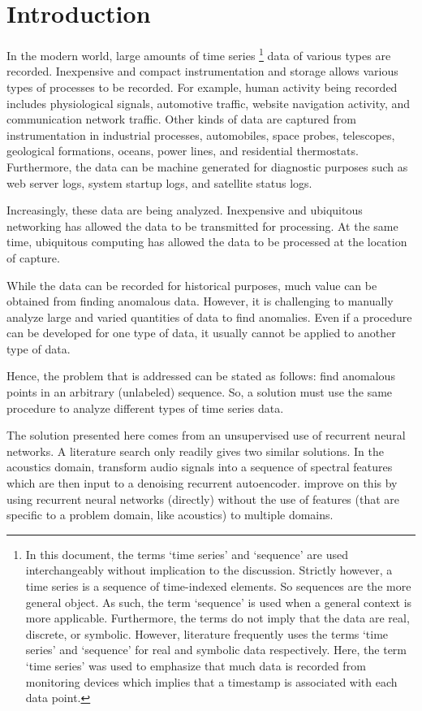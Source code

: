 \chapter{Introduction}
\label{ch:intro}

In the modern world, large amounts of time series%
\footnote{
In this document, the terms `time series' and `sequence' are used interchangeably without implication to the discussion.
%
Strictly however, a time series is a sequence of time-indexed elements.
%
So sequences are the more general object.
%
As such, the term `sequence' is used when a general context is more applicable.
%
Furthermore, the terms do not imply that the data are real, discrete, or symbolic.
%
However, literature frequently uses the terms `time series' and `sequence' for real and symbolic data respectively.
%
Here, the term `time series' was used to emphasize that much data is recorded from monitoring devices which implies that a timestamp is associated with each data point.}
data of various types are recorded.  Inexpensive and compact instrumentation and storage allows various types of processes to be recorded. For example, human activity being recorded includes physiological signals, automotive traffic, website navigation activity, and communication network traffic. Other kinds of data are captured from instrumentation in industrial processes, automobiles, space probes, telescopes, geological formations, oceans, power lines, and residential thermostats. Furthermore, the data can be machine generated for diagnostic purposes such as web server logs, system startup logs, and satellite status logs.

Increasingly, these data are being analyzed. Inexpensive and ubiquitous networking has allowed the data to be transmitted for processing. At the same time, ubiquitous computing has allowed the data to be processed at the location of capture.

While the data can be recorded for historical purposes, much value can be obtained from finding anomalous data. However, it is challenging to manually analyze large and varied quantities of data to find anomalies. Even if a procedure can be developed for one type of data, it usually cannot be applied to another type of data.

Hence, the problem that is addressed can be stated as follows: find anomalous points in an arbitrary (unlabeled) sequence. So, a solution must use the same procedure to analyze different types of time series data.

The solution presented here comes from an unsupervised use of recurrent neural networks. A literature search only readily gives two similar solutions. In the acoustics domain, \cite{Marchi2015} transform audio signals into a sequence of spectral features which are then input to a denoising recurrent autoencoder. \cite{Malhotra2015} improve on this by using recurrent neural networks (directly) without the use of features (that are specific to a problem domain, like acoustics) to multiple domains.


